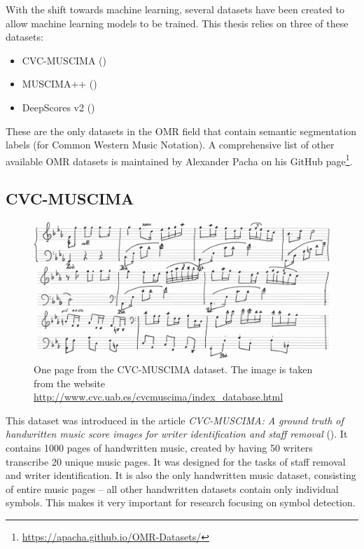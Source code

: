 With the shift towards machine learning, several datasets have been created to allow machine learning models to be trained. This thesis relies on three of these datasets:

\begin{itemize}
    \item CVC-MUSCIMA (\cite{CvcMuscima})
    \item MUSCIMA++ (\cite{MuscimaPP})
    \item DeepScores v2 (\cite{DeepScores})
\end{itemize}

These are the only datasets in the OMR field that contain semantic segmentation labels (for Common Western Music Notation). A comprehensive list of other available OMR datasets is maintained by Alexander Pacha on his GitHub page\footnote{\url{https://apacha.github.io/OMR-Datasets/}}.


\subsection{CVC-MUSCIMA}

\begin{figure}[ht]
    \centering
    \includegraphics[width=145mm]{../img/cvc-muscima.png}
    \caption{One page from the CVC-MUSCIMA dataset. The image is taken from the website \url{http://www.cvc.uab.es/cvcmuscima/index_database.html}}
    \label{fig:CvcMuscima}
\end{figure}

This dataset was introduced in the article \emph{CVC-MUSCIMA: A ground truth of handwritten music score images for writer identification and staff removal} (\cite{CvcMuscima}). It contains 1000 pages of handwritten music, created by having 50 writers transcribe 20 unique music pages. It was designed for the tasks of staff removal and writer identification. It is also the only handwritten music dataset, consisting of entire music pages -- all other handwritten datasets contain only individual symbols. This makes it very important for research focusing on symbol detection.

